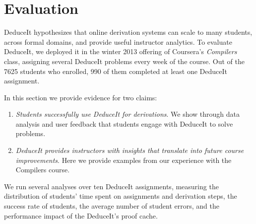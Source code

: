 \documentclass{sigchi}
\begin{document}
\section{Evaluation}

DeduceIt hypothesizes that online derivation systems can scale to many students, across formal domains, and provide useful instructor analytics. To evaluate DeduceIt, we deployed it in the winter 2013 offering of Coursera's \textit{Compilers} class, assigning several DeduceIt problems every week of the course. Out of the 7625 students who enrolled, 990 of them completed at least one DeduceIt assignment. %

In this section we provide evidence for two claims:
\begin{enumerate}
  \item \textit{Students successfully use DeduceIt for derivations}. We show through data analysis and user feedback that students engage with DeduceIt to solve problems.
  \item \textit{DeduceIt provides instructors with insights that translate into future course improvements}. Here we provide examples from our experience with the Compilers course. 
\end{enumerate}
  
We run several analyses over ten DeduceIt assignments, measuring the distribution of students' time spent on assignments and derivation steps, the success rate of students, the average number of student errors, and the performance impact of the DeduceIt's proof cache. 
\end{document}
